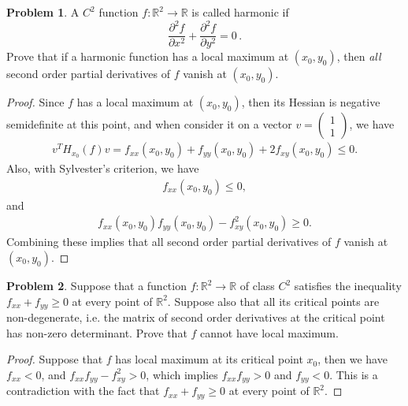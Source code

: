 \documentclass[11pt]{article}
\theoremstyle{definition}
\newtheorem{problem}{Problem}
\theoremstyle{definition}
\begin{document}
\medskip

\begin{problem}
A $C^2$ function $f:\mathbb{R}^2\to\mathbb{R}$ is called harmonic if
$$
\frac{\partial^2 f}{\partial x^2} +
\frac{\partial^2 f}{\partial y^2} = 0\, .
$$
Prove that if a harmonic function has a local maximum at $(x_0,y_0)$, then
{\em all} second order partial derivatives of $f$ vanish at $(x_0,y_0)$.
\end{problem}

\begin{proof}
Since $f$ has a local maximum at $(x_0, y_0)$, then its Hessian is negative semidefinite at this point, and when consider it on a vector $v = \begin{pmatrix} 1 \\ 1 \end{pmatrix}$, we have
\begin{align*}
    v^T H_{x_0}(f) v = f_{xx}(x_0,y_0) + f_{yy}(x_0,y_0) + 2 f_{xy}(x_0,y_0) \leq 0.
\end{align*}
Also, with Sylvester's criterion, we have
\begin{align*}
    f_{xx}(x_0,y_0) \leq 0,
\end{align*}
and 
\begin{align*}
    f_{xx}(x_0,y_0) f_{yy}(x_0,y_0) - f^2_{xy}(x_0,y_0) \geq 0.
\end{align*}
Combining these implies that all second order partial derivatives of $f$ vanish at $(x_0,y_0)$.
\end{proof}

\medskip

\begin{problem}
Suppose that a function $f:\mathbb{R}^2\to\mathbb{R}$ of class $C^2$ satisfies the inequality $f_{xx}+f_{yy}\geq 0$ at every point of $\mathbb{R}^2$. Suppose also that all its critical points are non-degenerate, i.e. the matrix of second order derivatives
at the critical point has non-zero determinant. Prove that $f$ cannot have local maximum.
\end{problem}
\begin{proof}
Suppose that $f$ has local maximum at its critical point $x_0$, then we have $f_{xx} < 0$, and $f_{xx}f_{yy} - f_{xy}^2 > 0$, which implies $f_{xx}f_{yy} > 0$ and $f_{yy} < 0$. This is a contradiction with the fact that $f_{xx}+f_{yy}\geq 0$ at every point of $\mathbb{R}^2$.
\end{proof}

\medskip
\end{document}
